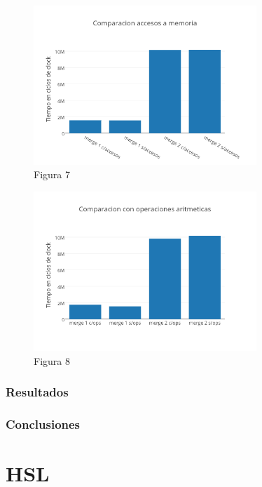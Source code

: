 \documentclass[a4paper]{article}
\begin{document}
\begin{figure}[h]
  \centering
    \includegraphics[width=0.75\textwidth]{imagenes/Comparacion accesos a memoria merge colores.png}
  \caption{Figura 7}
  \label{fig:graficomerge3}
\end{figure}
 \FloatBarrier

\begin{figure}[h]
  \centering
    \includegraphics[width=0.75\textwidth]{imagenes/Comparacion con operaciones aritmeticas merge colores.png}
  \caption{Figura 8}
  \label{fig:graficomerge4}
\end{figure}
 \FloatBarrier



\subsubsection{Resultados}

\subsubsection{Conclusiones}


\newpage

\section{HSL}
\end{document}
